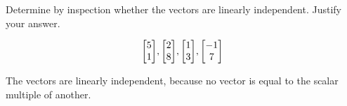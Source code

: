 \documentclass{../mathhomework}
\newenvironment{Mat}{\begin{bmatrix}}{\end{bmatrix}}
\begin{document}
\begin{problem}[1.7\#15]
    Determine by inspection whether the vectors are linearly independent. Justify your answer.

    \begin{equation*}
        \begin{Mat}
            5 \\ 1
        \end{Mat},
        \begin{Mat}
            2 \\ 8
        \end{Mat},
        \begin{Mat}
            1 \\ 3
        \end{Mat},
        \begin{Mat}
            -1 \\ 7
        \end{Mat}
    \end{equation*}

    \begin{solution}
        The vectors are linearly independent, because no vector is equal to the scalar multiple of another.
    \end{solution}
\end{problem}

\newpage
\end{document}
